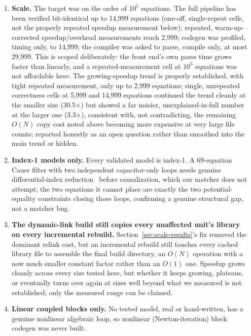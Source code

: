 \documentclass[journal]{IEEEtran}
\begin{document}
\begin{enumerate}
\item \textbf{Scale.} The target was on the order of $10^5$ equations. The full pipeline has been verified bit-identical up to 14,999 equations (one-off, single-repeat cells, not the properly repeated speedup measurement below); repeated, warm-up-corrected speedup/overhead measurements reach 2,999; codegen was profiled, timing only, to 14,999; the compiler was asked to parse, compile only, at most 29,999. This is scoped deliberately: the front end's own parse time grows faster than linearly, and a repeated-measurement cell at $10^5$ equations was not affordable here. The growing-speedup trend is properly established, with tight repeated measurement, only up to 2,999 equations; single, unrepeated correctness cells at 5,999 and 14,999 equations continued the trend cleanly at the smaller size (30.5$\times$) but showed a far noisier, unexplained-in-full number at the larger one (3.3$\times$), consistent with, not contradicting, the remaining $O(N)$ copy cost noted above becoming more expensive at very large file counts; reported honestly as an open question rather than smoothed into the main trend or hidden.

\item \textbf{Index-1 models only.} Every validated model is index-1. A 69-equation Cauer filter with two independent capacitor-only loops needs genuine differential-index reduction~\cite{pantelides1988consistent} before causalization, which our matcher does not attempt; the two equations it cannot place are exactly the two potential-equality constraints closing those loops, confirming a genuine structural gap, not a matcher bug.

\item \textbf{The dynamic-link build still copies every unaffected unit's library on every incremental rebuild.} Section~\ref{sec:scale-results}'s fix removed the dominant relink cost, but an incremental rebuild still touches every cached library file to assemble the final build directory, an $O(N)$ operation with a now much smaller constant factor rather than an $O(1)$ one. Speedup grows cleanly across every size tested here, but whether it keeps growing, plateaus, or eventually turns over again at sizes well beyond what we measured is not established; only the measured range can be claimed.

\item \textbf{Linear coupled blocks only.} No tested model, real or hand-written, has a genuine nonlinear algebraic loop, so nonlinear (Newton-iteration) block codegen was never built.


\end{enumerate}
\end{document}
